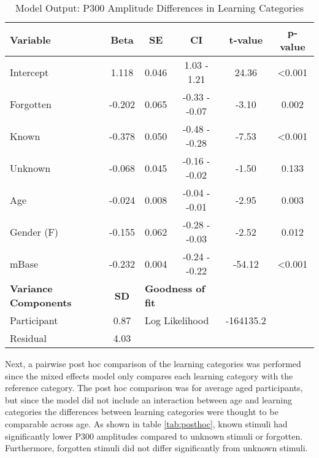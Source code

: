 \begin{table}[H]
\centering
\begin{tabular}{lccccc}
\hline
\textbf{Variable}            & \textbf{Beta} & \textbf{SE}          & \textbf{CI}           & \textbf{t-value} & \textbf{p-value} \\ \hline
Intercept                    & 1.118         & 0.046                & 1.03 - 1.21           & 24.36           & \textless{}0.001 \\
Forgotten                          & -0.202        & 0.065                & -0.33 - -0.07           & -3.10         & 0.002 \\
Known                          & -0.378         & 0.050               & -0.48 - -0.28           & -7.53            & \textless{}0.001  \\
Unknown                          & -0.068         & 0.045              & -0.16 - -0.02           & -1.50            & 0.133  \\
Age                          & -0.024         & 0.008             & -0.04 - -0.01           & -2.95           & 0.003  \\
Gender (F)                 & -0.155      & 0.062                & -0.28 - -0.03           & -2.52           & 0.012\\
mBase                    & -0.232         & 0.004                & -0.24 - -0.22         & -54.12             & \textless{}0.001 \\\hline
\textbf{Variance Components} & \textbf{SD}   & \multicolumn{2}{l}{\textbf{Goodness of fit}} & \textbf{}        & \textbf{}        \\ \hline
Participant                  & 0.87          & \multicolumn{2}{l}{Log Likelihood}           & -164135.2        &                  \\

Residual                     & 4.03         &                      &                       &                  &                  \\ \hline

\end{tabular}
\caption{Model Output: P300 Amplitude Differences in Learning Categories}
\label{tab:ReP3Cat}
\end{table}


Next, a pairwise post hoc comparison of the learning categories was performed since the mixed effects model only compares each learning category with the reference category. The post hoc comparison was for average aged participants, but since the model did not include an interaction between age and learning categories the differences between learning categories were thought to be comparable across age. As shown in table \ref{tab:posthoc}, known stimuli had significantly lower P300 amplitudes compared to unknown stimuli or forgotten. Furthermore, forgotten stimuli did not differ significantly from unknown stimuli.

